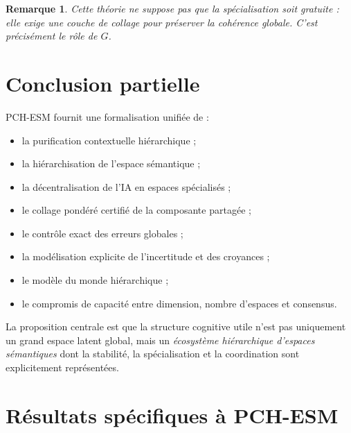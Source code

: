 \documentclass[11pt,a4paper]{article}
\newtheorem{remark}{Remarque}[section]
\newcommand{\1}{\mathbf 1}
\begin{document}
\begin{remark}
Cette théorie ne suppose pas que la spécialisation soit gratuite : elle exige une couche de collage pour préserver la cohérence globale.
C'est précisément le rôle de \(G\).
\end{remark}

\section{Conclusion partielle}

PCH-ESM fournit une formalisation unifiée de :
\begin{itemize}[leftmargin=2em]
    \item la purification contextuelle hiérarchique ;
    \item la hiérarchisation de l'espace sémantique ;
    \item la décentralisation de l'IA en espaces spécialisés ;
    \item le collage pondéré certifié de la composante partagée ;
    \item le contrôle exact des erreurs globales ;
    \item la modélisation explicite de l'incertitude et des croyances ;
    \item le modèle du monde hiérarchique ;
    \item le compromis de capacité entre dimension, nombre d'espaces et consensus.
\end{itemize}

La proposition centrale est que la structure cognitive utile n'est pas uniquement un grand espace latent global, mais un \emph{écosystème hiérarchique d'espaces sémantiques} dont la stabilité, la spécialisation et la coordination sont explicitement représentées.








\section{Résultats spécifiques à PCH-ESM}
\end{document}
